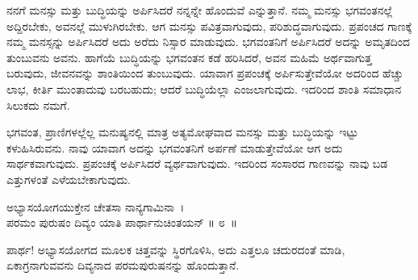 ನನಗೆ ಮನಸ್ಸು ಮತ್ತು ಬುದ್ಧಿಯನ್ನು ಅರ್ಪಿಸಿದರೆ ನನ್ನನ್ನೇ ಹೊಂದುವೆ ಎನ್ನುತ್ತಾನೆ. ನಮ್ಮ ಮನಸ್ಸು ಭಗವಂತನಲ್ಲೆ ಅದ್ದಿರಬೇಕು, ಅವನಲ್ಲೆ ಮುಳುಗಿರಬೇಕು. ಆಗ ಮನಸ್ಸು ಪವಿತ್ರವಾಗುವುದು, ಪರಿಶುದ್ಧವಾಗುವುದು. ಪ್ರಪಂಚದ ಗಾಣಕ್ಕೆ ನಮ್ಮ ಮನಸ್ಸನ್ನು ಅರ್ಪಿಸಿದರೆ ಅದು ಅರೆದು ನಿಸ್ಸಾರ ಮಾಡುವುದು. ಭಗವಂತನಿಗೆ ಅರ್ಪಿಸಿದರೆ ಅದನ್ನು ಅಮೃತದಿಂದ ತುಂಬುವನು ಅವನು. ಹಾಗೆಯೆ ಬುದ್ಧಿಯನ್ನು ಭಗವಂತನ ಕಡೆ ಹರಿಸಿದರೆ, ಅವನ ಮಹಿಮೆ ಅರ್ಥವಾಗುತ್ತ ಬರುವುದು, ಜೀವನವನ್ನು ಶಾಂತಿಯಿಂದ ತುಂಬುವುದು. ಯಾವಾಗ ಪ್ರಪಂಚಕ್ಕೆ ಅರ್ಪಿಸುತ್ತೇವೆಯೋ ಅದರಿಂದ ಹೆಚ್ಚು ಲಾಭ, ಕೀರ್ತಿ ಮುಂತಾದುವು ಬರಬಹುದು; ಆದರೆ ಬುದ್ಧಿಯೆಲ್ಲಾ ಎಂಜಲಾಗುವುದು. ಇದರಿಂದ ಶಾಂತಿ ಸಮಾಧಾನ ಸಿಲುಕದು ನಮಗೆ.

ಭಗವಂತ, ಪ್ರಾಣಿಗಳಲ್ಲೆಲ್ಲ ಮನುಷ್ಯನಲ್ಲಿ ಮಾತ್ರ ಅತ್ಯಮೋಘವಾದ ಮನಸ್ಸು ಮತ್ತು ಬುದ್ಧಿಯನ್ನು ಇಟ್ಟು ಕಳುಹಿಸಿರುವನು. ನಾವು ಯಾವಾಗ ಅದನ್ನು ಭಗವಂತನಿಗೆ ಅರ್ಪಣೆ ಮಾಡುತ್ತೇವೆಯೋ ಆಗ ಅದು ಸಾರ್ಥಕವಾಗುವುದು. ಪ್ರಪಂಚಕ್ಕೆ ಅರ್ಪಿಸಿದರೆ ವ್ಯರ್ಥವಾಗುವುದು. ಇದರಿಂದ ಸಂಸಾರದ ಗಾಣವನ್ನು ನಾವು ಬಡ ಎತ್ತುಗಳಂತೆ ಎಳೆಯಬೇಕಾಗುವುದು.

\begin{shloka}
ಅಭ್ಯಾಸಯೋಗಯುಕ್ತೇನ ಚೇತಸಾ ನಾನ್ಯಗಾಮಿನಾ~।\\ಪರಮಂ ಪುರುಷಂ ದಿವ್ಯಂ ಯಾತಿ ಪಾರ್ಥಾನುಚಿಂತಯನ್ \hfill॥ ೮~॥
\end{shloka}

\begin{artha}
ಪಾರ್ಥ! ಅಭ್ಯಾಸಯೋಗದ ಮೂಲಕ ಚಿತ್ತವನ್ನು ಸ್ಥಿರಗೊಳಿಸಿ, ಅದು ಎತ್ತಲೂ ಚದುರದಂತೆ ಮಾಡಿ, ಏಕಾಗ್ರನಾಗುವವನು ದಿವ್ಯನಾದ ಪರಮಪುರುಷನನ್ನು ಹೊಂದುತ್ತಾನೆ.
\end{artha}

